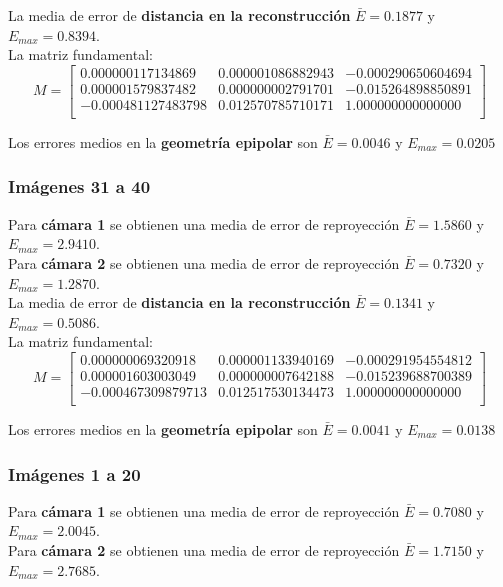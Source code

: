 \documentclass[a4paper, fontsize=11pt]{scrartcl} %
\numberwithin{equation}{section} %
\numberwithin{figure}{section} %
\numberwithin{table}{section} %
\begin{document}
	La media de error de \textbf{distancia en la reconstrucción} $\bar{E} = 0.1877$ y $E_{max} = 0.8394$.\\
	La matriz fundamental:
	\[
	M=
	\begin{bmatrix}
	0.000000117134869&	0.000001086882943&	-0.000290650604694 \\
	0.000001579837482&	0.000000002791701&	-0.015264898850891 \\
	-0.000481127483798&	0.012570785710171&	1.000000000000000  \\
	
	\end{bmatrix}
	\]
	
	Los errores medios en la \textbf{geometría epipolar} son $\bar{E} = 0.0046$ y $E_{max} = 0.0205$
	
	\subsubsection*{Imágenes 31 a 40}
	
	Para \textbf{cámara 1} se obtienen una media de error de reproyección $\bar{E} = 1.5860$ y $E_{max} = 2.9410$.\\
	Para \textbf{cámara 2} se obtienen una media de error de reproyección $\bar{E} = 0.7320$ y $E_{max} = 1.2870$.\\
	
	La media de error de \textbf{distancia en la reconstrucción} $\bar{E} = 0.1341$ y $E_{max} = 0.5086$.\\
	La matriz fundamental:
	\[
	M=
	\begin{bmatrix}
	0.000000069320918&	0.000001133940169&	-0.000291954554812 \\
	0.000001603003049&	0.000000007642188&	-0.015239688700389 \\
	-0.000467309879713&	0.012517530134473&	1.000000000000000 \\
	
	\end{bmatrix}
	\]
	
	Los errores medios en la \textbf{geometría epipolar} son $\bar{E} = 0.0041$ y $E_{max} = 0.0138$
	
	\subsubsection*{Imágenes 1 a 20}
	
	Para \textbf{cámara 1} se obtienen una media de error de reproyección $\bar{E} = 0.7080$ y $E_{max} = 2.0045$.\\
	Para \textbf{cámara 2} se obtienen una media de error de reproyección $\bar{E} = 1.7150$ y $E_{max} = 2.7685$.\\
	
\end{document}
